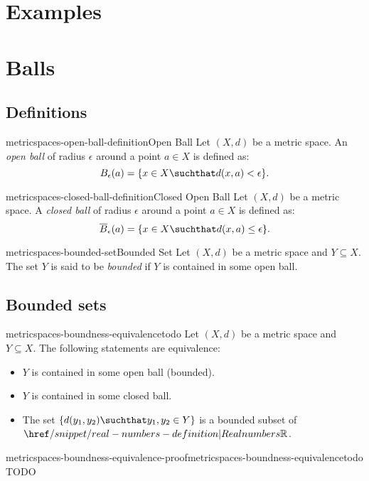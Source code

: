 \documentclass[preview]{standalone}
\begin{document}
\section{Examples}


\section{Balls}

\subsection{Definitions}

\begin{snippetdefinition}{metricspaces-open-ball-definition}{Open Ball}
    Let \((X, d)\) be a metric space.
    An \textit{open ball} of radius \(\epsilon\) around a point
    \(a \in X\) is defined as:
    \[
        B_\epsilon(a) = \{x \in X \suchthat d(x,a) < \epsilon\}.
    \]
\end{snippetdefinition}

\begin{snippetdefinition}{metricspaces-closed-ball-definition}{Closed Open Ball}
    Let \((X, d)\) be a metric space.
    A \textit{closed ball} of radius \(\epsilon\) around a point
    \(a \in X\) is defined as:
    \[
        \overline{B}_\epsilon(a) = \{x \in X \suchthat d(x,a) \leq \epsilon\}.
    \]
\end{snippetdefinition}

\begin{snippetdefinition}{metricspaces-bounded-set}{Bounded Set}
    Let \((X, d)\) be a metric space and \(Y \subseteq X\).
    The set \(Y\) is said to be \textit{bounded} if \(Y\)
    is contained in some open ball.
\end{snippetdefinition}

\subsection{Bounded sets}

\begin{snippetlemma}{metricspaces-boundness-equivalence}{todo}
    Let \((X, d)\) be a metric space and \(Y \subseteq X\).
    The following statements are equivalence:
    \begin{itemize}
        \item \(Y\) is contained in some open ball (bounded).
        \item \(Y\) is contained in some closed ball.
        \item The set \(\{d(y_1,y_2) \suchthat y_1, y_2 \in Y\}\)
            is a bounded subset of \(\realnumbers\).
    \end{itemize}
\end{snippetlemma}

\begin{snippetproof}{metricspaces-boundness-equivalence-proof}{metricspaces-boundness-equivalence}{todo}
    TODO
\end{snippetproof}
\end{document}
